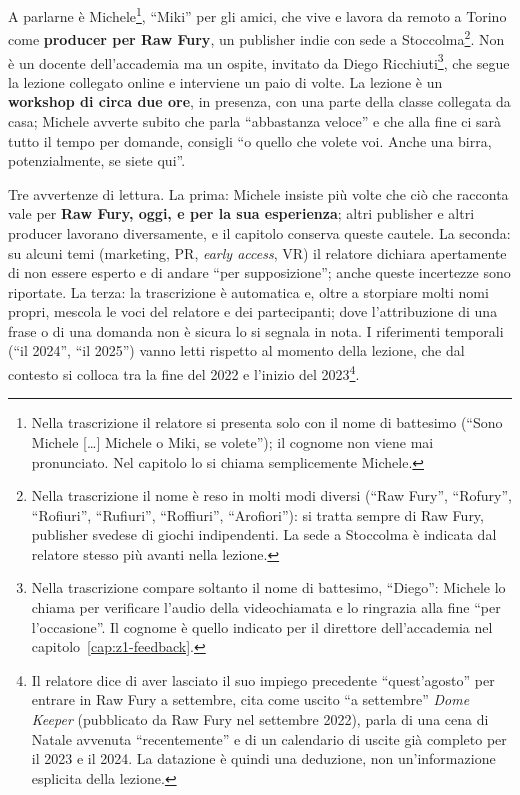 A parlarne è Michele\footnote{Nella trascrizione il relatore si presenta solo
con il nome di battesimo (``Sono Michele [\dots] Michele o Miki, se volete'');
il cognome non viene mai pronunciato. Nel capitolo lo si chiama semplicemente
Michele.}, ``Miki'' per gli amici, che vive e lavora da remoto a Torino come
\textbf{producer per Raw Fury}, un publisher indie con sede a
Stoccolma\footnote{Nella trascrizione il nome è reso in molti modi diversi
(``Raw Fury'', ``Rofury'', ``Rofiuri'', ``Rufiuri'', ``Roffiuri'', ``Arofiori''):
si tratta sempre di Raw Fury, publisher svedese di giochi indipendenti. La sede
a Stoccolma è indicata dal relatore stesso più avanti nella lezione.}. Non è
un docente dell'accademia ma un ospite, invitato da Diego
Ricchiuti\footnote{Nella trascrizione compare soltanto il nome di battesimo,
``Diego'': Michele lo chiama per verificare l'audio della videochiamata e lo
ringrazia alla fine ``per l'occasione''. Il cognome è quello indicato per il
direttore dell'accademia nel capitolo~\ref{cap:z1-feedback}.}, che segue la
lezione collegato online e interviene un paio di volte. La lezione è un
\textbf{workshop di circa due ore}, in presenza, con una parte della classe
collegata da casa; Michele avverte subito che parla ``abbastanza veloce'' e che
alla fine ci sarà tutto il tempo per domande, consigli ``o quello che volete
voi. Anche una birra, potenzialmente, se siete qui''.

Tre avvertenze di lettura. La prima: Michele insiste più volte che ciò che
racconta vale per \textbf{Raw Fury, oggi, e per la sua esperienza}; altri
publisher e altri producer lavorano diversamente, e il capitolo conserva queste
cautele. La seconda: su alcuni temi (marketing, PR, \emph{early access}, VR) il
relatore dichiara apertamente di non essere esperto e di andare ``per
supposizione''; anche queste incertezze sono riportate. La terza: la
trascrizione è automatica e, oltre a storpiare molti nomi propri, mescola le
voci del relatore e dei partecipanti; dove l'attribuzione di una frase o di una
domanda non è sicura lo si segnala in nota. I riferimenti temporali (``il
2024'', ``il 2025'') vanno letti rispetto al momento della lezione, che dal
contesto si colloca tra la fine del 2022 e l'inizio del 2023\footnote{Il
relatore dice di aver lasciato il suo impiego precedente ``quest'agosto'' per
entrare in Raw Fury a settembre, cita come uscito ``a settembre'' \emph{Dome
Keeper} (pubblicato da Raw Fury nel settembre 2022), parla di una cena di
Natale avvenuta ``recentemente'' e di un calendario di uscite già completo per
il 2023 e il 2024. La datazione è quindi una deduzione, non un'informazione
esplicita della lezione.}.

